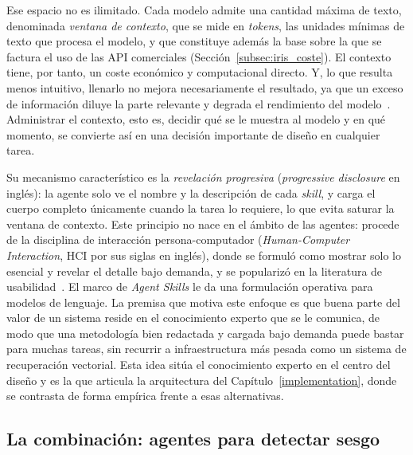 Ese espacio no es ilimitado. Cada modelo admite una cantidad máxima de texto,
denominada \textit{ventana de contexto}, que se mide en \textit{tokens}, las
unidades mínimas de texto que procesa el modelo, y que constituye además la base
sobre la que se factura el uso de las API comerciales
(Sección~\ref{subsec:iris_coste}). El contexto tiene, por tanto, un
coste económico y computacional directo. Y, lo que resulta menos intuitivo,
llenarlo no mejora necesariamente el resultado, ya que un exceso de información
diluye la parte relevante y degrada el rendimiento del
modelo~\cite{liu2023lost}. Administrar el contexto, esto es, decidir qué se le
muestra al modelo y en qué momento, se convierte así en una decisión importante de diseño en cualquier tarea.

Su mecanismo característico es la \textit{revelación
progresiva} (\textit{progressive disclosure} en inglés): la agente solo ve el nombre y la
descripción de cada \textit{skill}, y carga el cuerpo completo únicamente cuando la tarea lo
requiere, lo que evita saturar la ventana de contexto. Este principio no nace en el
ámbito de las agentes: procede de la disciplina de interacción persona-computador (\textit{Human-Computer Interaction}, HCI por sus siglas en inglés), donde se
formuló como mostrar solo lo esencial y revelar el detalle bajo demanda, y se
popularizó en la literatura de usabilidad~\cite{nielsen1994}. El marco de
\textit{Agent Skills} le da una formulación operativa para modelos de lenguaje. La premisa que motiva
este enfoque es que buena parte del valor de un sistema reside en el conocimiento
experto que se le comunica, de modo que una metodología bien redactada y cargada
bajo demanda puede bastar para muchas tareas, sin recurrir a infraestructura más
pesada como un sistema de recuperación vectorial. Esta idea sitúa el conocimiento
experto en el centro del diseño y es la que articula la arquitectura del
Capítulo~\ref{implementation}, donde se contrasta de forma empírica frente a esas
alternativas.
\subsection{La combinación: agentes para detectar sesgo}

